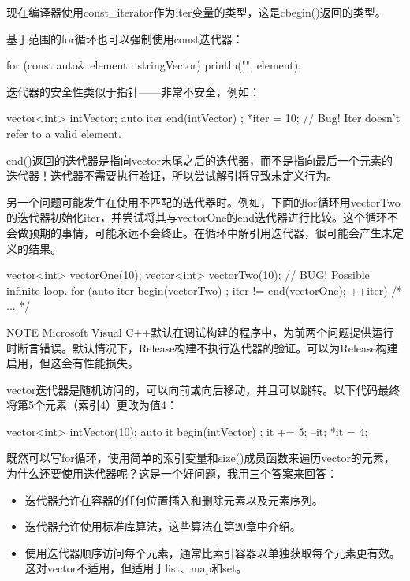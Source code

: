 现在编译器使用const\_iterator作为iter变量的类型，这是cbegin()返回的类型。

基于范围的for循环也可以强制使用const迭代器：

\begin{cpp}
for (const auto& element : stringVector) {
    println("{}", element);
}
\end{cpp}


迭代器的安全性类似于指针——非常不安全，例如：

\begin{cpp}
vector<int> intVector;
auto iter { end(intVector) };
*iter = 10; // Bug! Iter doesn't refer to a valid element.
\end{cpp}

end()返回的迭代器是指向vector末尾之后的迭代器，而不是指向最后一个元素的迭代器！迭代器不需要执行验证，所以尝试解引将导致未定义行为。

另一个问题可能发生在使用不匹配的迭代器时。例如，下面的for循环用vectorTwo的迭代器初始化iter，并尝试将其与vectorOne的end迭代器进行比较。这个循环不会做预期的事情，可能永远不会终止。在循环中解引用迭代器，很可能会产生未定义的结果。

\begin{cpp}
vector<int> vectorOne(10);
vector<int> vectorTwo(10);
// BUG! Possible infinite loop.
for (auto iter { begin(vectorTwo) }; iter != end(vectorOne); ++iter) { /* ... */ }
\end{cpp}

\begin{myNotic}{NOTE}
Microsoft Visual C++默认在调试构建的程序中，为前两个问题提供运行时断言错误。默认情况下，Release构建不执行迭代器的验证。可以为Release构建启用，但这会有性能损失。
\end{myNotic}


vector迭代器是随机访问的，可以向前或向后移动，并且可以跳转。以下代码最终将第5个元素（索引4）更改为值4：

\begin{cpp}
vector<int> intVector(10);
auto it { begin(intVector) };
it += 5;
--it;
*it = 4;
\end{cpp}


既然可以写for循环，使用简单的索引变量和size()成员函数来遍历vector的元素，为什么还要使用迭代器呢？这是一个好问题，我用三个答案来回答：

\begin{itemize}
\item
迭代器允许在容器的任何位置插入和删除元素以及元素序列。

\item
迭代器允许使用标准库算法，这些算法在第20章中介绍。

\item
使用迭代器顺序访问每个元素，通常比索引容器以单独获取每个元素更有效。这对vector不适用，但适用于list、map和set。
\end{itemize}

